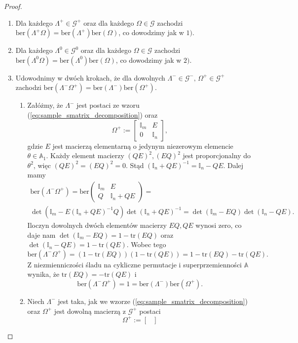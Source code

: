 \documentclass[11pt,a4paper]{report}
\theoremstyle{definition}
\newcommand{\tr}{\mathrm{tr}}
\newcommand{\ber}{\mathrm{ber}}
\newcommand{\I}{\mathbb{I}}
\begin{document}
\begin{proof}
\begin{enumerate}[1)]
\item Dla każdego $\Lambda^+ \in \mathcal{G}^+$ oraz dla każdego $\Omega \in \mathcal{G}$ zachodzi $\ber (\Lambda^+ \Omega) = \ber(\Lambda^+) \ber(\Omega)$, co dowodzimy jak w $1)$.
\item Dla każdego $\Lambda^0 \in \mathcal{G}^0$ oraz dla każdego $\Omega \in \mathcal{G}$ zachodzi $\ber (\Lambda^0 \Omega) = \ber(\Lambda^0) \ber(\Omega)$, co dowodzimy jak w $2)$.
\item Udowodnimy w dwóch krokach, że dla dowolnych $\Lambda^- \!\!\in \mathcal{G}^-,\, \Omega^+ \!\!\in \mathcal{G}^+$ zachodzi $\ber (\Lambda^- \Omega^+) = \ber(\Lambda^-) \ber(\Omega^+)$. \begin{enumerate}[5.1)] \item Załóżmy, że $\Lambda^-$ jest postaci ze wzoru (\ref{eq:sample_smatrix_decomposition}) oraz $$\Omega^+ := \begin{bmatrix}
     \I_m & E \\
     0 & \I_n 
     \end{bmatrix}\!,$$
gdzie $E$ jest macierzą elementarną o jedynym niezerowym elemencie $\theta \in \mathbb{A}_1$. Każdy element macierzy $(QE)^2, (EQ)^2$ jest proporcjonalny do $\theta^2$, więc $(QE)^2= (EQ)^2=0$. Stąd $(\I_n + QE)^{-1} = \I_n - QE$. Dalej mamy
\begin{equation*}
\begin{gathered}
\ber(\Lambda^- \Omega^+) = \ber \left( \begin{matrix}
     \I_m & E \\
     Q & \I_n + QE
     \end{matrix} \right) = \\ \det(\I_m - E(\I_n + QE)^{-1}Q) \det (\I_n + QE)^{-1}
= \det(\I_m - EQ) \det (\I_n - QE).
\end{gathered}
\end{equation*}
Iloczyn dowolnych dwóch elementów macierzy $EQ, QE$ wynosi zero, co daje nam $\det(\I_m - EQ) = 1 - \tr(EQ)$ oraz $\det (\I_n - QE) = 1 - \tr(QE)$. Wobec tego $$\ber(\Lambda^- \Omega^+) = (1 - \tr(EQ))(1 - \tr(QE)) = 1 - \tr(EQ) - \tr(QE).$$
Z niezmienniczości śladu na cykliczne permutacje i superprzemienności $\mathbb{A}$ wynika, że $ \tr(EQ) =  - \tr(QE)$ i
$$\ber (\Lambda^- \Omega^+) = 1 = \ber(\Lambda^-)\ber(\Omega^+).$$
\item Niech $\Lambda^-$ jest taka, jak we wzorze (\ref{eq:sample_smatrix_decomposition}) oraz $\Omega^+$ jest dowolną macierzą z $\mathcal{G}^+$ postaci $$\Omega^+ := \begin{bmatrix} 

\end{bmatrix}$$
\end{enumerate}
\end{enumerate}
\end{proof}
\end{document}
